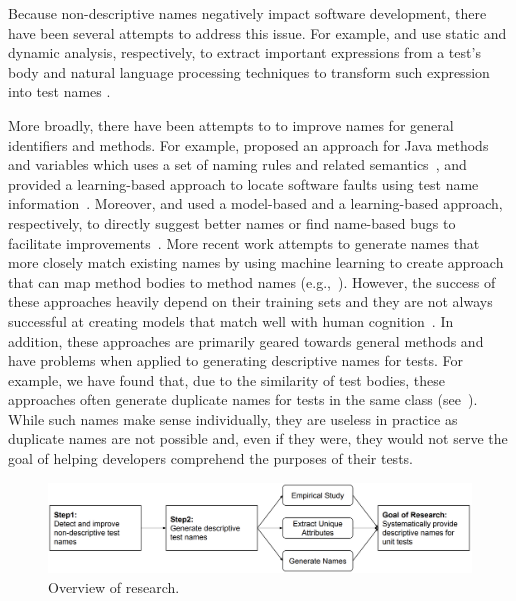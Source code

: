 Because non-descriptive names negatively impact software development, there have been several attempts to address this issue. %
For example, \citeauthor{zhang2016towards} and \citeauthor{daka2017generating} use static and dynamic analysis, respectively, to extract important expressions from a test's body and natural language processing techniques to transform such expression into test names \cite{zhang2016towards, daka2017generating}.
%



More broadly, there have been attempts to to improve names for general identifiers and methods.
%
For example, \citeauthor{host2009debugging} proposed an approach for Java methods and variables which uses a set of naming rules and related semantics~\cite{host2009debugging}, and \citeauthor{li2019deepfl} provided a learning-based approach to locate software faults using test name information~\cite{li2019deepfl}.
%
Moreover, \citeauthor{allamanis2015suggesting} and \citeauthor{pradel2018deepbugs} used a model-based and a learning-based approach, respectively, to directly suggest better names or find name-based bugs to facilitate improvements~\cite{allamanis2015suggesting, pradel2018deepbugs}.
%
More recent work attempts to generate names that more closely match existing names by using machine learning to create approach that can map method bodies to method names (e.g.,~\cite{alon2018code2seq, alon2019code2vec}).
%
However, the success of these approaches heavily depend on their training sets and they are not always successful at creating models that match well with human cognition~\cite{lison2015introduction}.
%
In addition, these approaches are primarily geared towards general methods and have problems when applied to generating descriptive names for tests.
%
For example, we have found that, due to the similarity of test bodies, these approaches often generate duplicate names for tests in the same class (see~\cite{CodeResult}).
%
While such names make sense individually, they are useless in practice as duplicate names are not possible and, even if they were, they would not serve the goal of helping developers comprehend the purposes of their tests.


\begin{figure}[t]
\centering
\includegraphics[scale=0.35]{figures/all-research.png}
\caption{Overview of research.}
\label{fig:all-research}
\end{figure}

